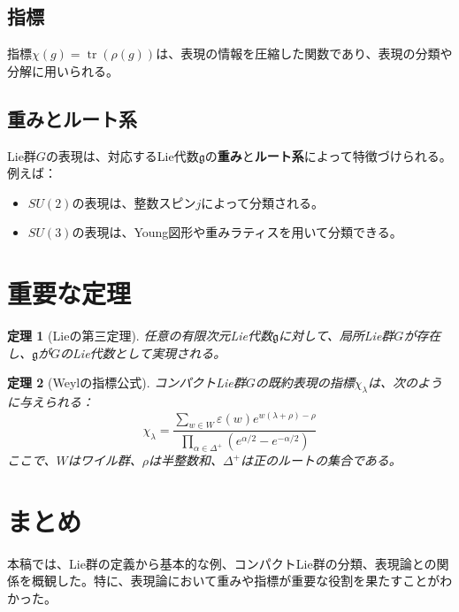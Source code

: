 \documentclass{article}
\newtheorem{theorem}{定理} %
\begin{document}
\subsection{指標}
指標$\chi(g) = \operatorname{tr}(\rho(g))$は、表現の情報を圧縮した関数であり、表現の分類や分解に用いられる。

\subsection{重みとルート系}
Lie群$G$の表現は、対応するLie代数$\mathfrak{g}$の\textbf{重み}と\textbf{ルート系}によって特徴づけられる。例えば：
\begin{itemize}
    \item $SU(2)$の表現は、整数スピン$j$によって分類される。
    \item $SU(3)$の表現は、Young図形や重みラティスを用いて分類できる。
\end{itemize}

\section{重要な定理}
\begin{theorem}[Lieの第三定理]
任意の有限次元Lie代数$\mathfrak{g}$に対して、局所Lie群$G$が存在し、$\mathfrak{g}$が$G$のLie代数として実現される。
\end{theorem}

\begin{theorem}[Weylの指標公式]
コンパクトLie群$G$の既約表現の指標$\chi_\lambda$は、次のように与えられる：
\[
\chi_\lambda = \frac{\sum_{w \in W} \varepsilon(w) e^{w(\lambda + \rho) - \rho}}{\prod_{\alpha \in \Delta^+} (e^{\alpha/2} - e^{-\alpha/2})}
\]
ここで、$W$はワイル群、$\rho$は半整数和、$\Delta^+$は正のルートの集合である。
\end{theorem}

\section{まとめ}
本稿では、Lie群の定義から基本的な例、コンパクトLie群の分類、表現論との関係を概観した。特に、表現論において重みや指標が重要な役割を果たすことがわかった。
\end{document}
